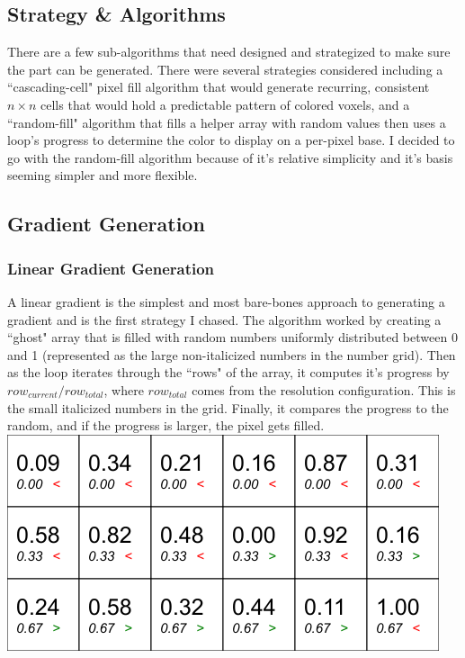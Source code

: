 \documentclass{article}
\begin{document}
\begin{multicols}{2}
\section{Strategy \& Algorithms}
There are a few sub-algorithms that need designed and strategized to make sure the part can be generated. There were several strategies considered including a ``cascading-cell" pixel fill algorithm that would generate recurring, consistent $n\times n$ cells that would hold a predictable pattern of colored voxels, and a ``random-fill" algorithm that fills a helper array with random values then uses a loop's progress to determine the color to display on a per-pixel base. I decided to go with the random-fill algorithm because of it's relative simplicity and it's basis seeming simpler and more flexible.

\subsection{Gradient Generation} \label{gradient generation}

\subsubsection{Linear Gradient Generation}
A linear gradient is the simplest and most bare-bones approach to generating a gradient and is the first strategy I chased. The algorithm worked by creating a ``ghost" array that is filled with random numbers uniformly distributed between 0 and 1 (represented as the large non-italicized numbers in the number grid). Then as the loop iterates through the ``rows" of the array, it computes it's progress by $row_{current}/row_{total}$, where $row_{total}$ comes from the resolution configuration. This is the small italicized numbers in the grid. Finally, it compares the progress to the random, and if the progress is larger, the pixel gets filled.
\\

\noindent
\includegraphics[width=\columnwidth]{slice_000_rand}
\\


\end{multicols}
\end{document}
